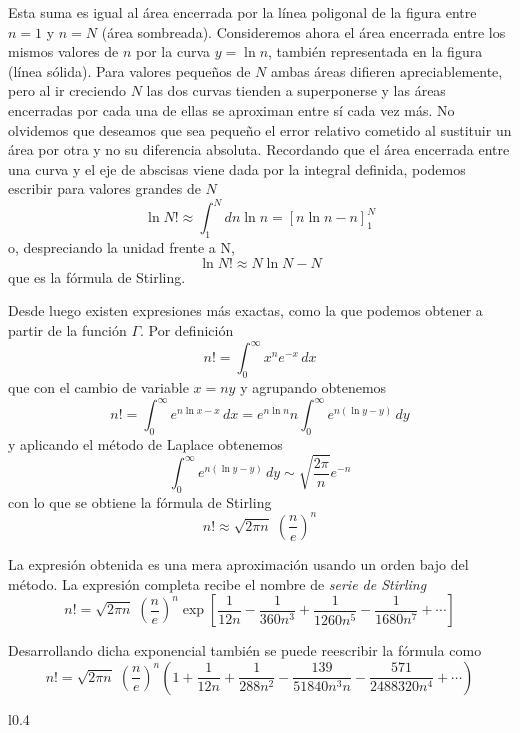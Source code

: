 Esta suma es igual al área encerrada por la línea poligonal de la figura entre $n = 1$ y $n = N$ (área sombreada).
Consideremos ahora el área encerrada entre los mismos valores de $n$ por la curva $y = \ln n$, también representada en la figura (línea sólida).
Para valores pequeños de $N$ ambas áreas difieren apreciablemente, pero al ir creciendo $N$ las dos curvas tienden a superponerse y las áreas encerradas por cada una de ellas se aproximan entre sí cada vez más.
No olvidemos que deseamos que sea pequeño el error relativo cometido al sustituir un área por otra y no su diferencia absoluta.
Recordando que el área encerrada entre una curva y el eje de abscisas viene dada por la integral definida, podemos escribir para valores grandes de $N$
\begin{equation}
	\ln N! \approx \int_{1}^{N} dn\ln n = \left[ n\ln n - n \right]_1^N
\end{equation}
o, despreciando la unidad frente a N,
\begin{equation}\label{eq:Stirl}
	\boxed{\ln N! \approx N\ln N - N}
\end{equation}
que es la fórmula de Stirling.

Desde luego existen expresiones más exactas, como la que podemos obtener a partir de la función $\Gamma$. Por definición
\begin{equation}
	n! = \int_0^\infty x^n e^{-x}\, dx
\end{equation}
que con el cambio de variable $x = ny$ y agrupando obtenemos
\begin{equation}
	n! = \int_0^\infty e^{n\ln x-x}\, dx = e^{n \ln n} n \int_0^\infty e^{n(\ln y -y)}\, dy
\end{equation}
y aplicando el método de Laplace obtenemos
\begin{equation}
	\int_0^\infty e^{n(\ln y -y)}\, dy \sim  \sqrt{\frac{2\pi}{n}} e^{-n}
\end{equation}
con lo que se obtiene la fórmula de Stirling
$$n! \approx \sqrt{2 \pi n} \; \left(\frac{n}{e}\right)^{n}$$

La expresión obtenida es una mera aproximación usando un orden bajo del método.
La expresión completa recibe el nombre de \emph{serie de Stirling}
\begin{equation}
	n! = \sqrt{2 \pi n} \; \left(\frac{n}{e}\right)^{n} \exp\left[ 
		{\frac{1}{12n}}
		-{\frac{1}{360n^3}}
		+{\frac{1}{1260n^5}}
		-{\frac{1}{1680n^7}}
		+\cdots \right] 
\end{equation}

Desarrollando dicha exponencial también se puede reescribir la fórmula como
\begin{equation}
	n! = \sqrt{2 \pi n} \; \left(\frac{n}{e}\right)^{n}
		\left(
			1
			+{\frac{1}{12n}}
			+{\frac{1}{288n^2}}
			-{\frac{139}{51840n^3n}}
			-{\frac{571}{2488320n^4}}
			+ \cdots
		\right)
\end{equation}
\begin{wrapfigure}{l}{0.4\textwidth}
	\centering
	\hspace{-1.5cm}
	
	\vspace{-1cm}
\end{wrapfigure}

